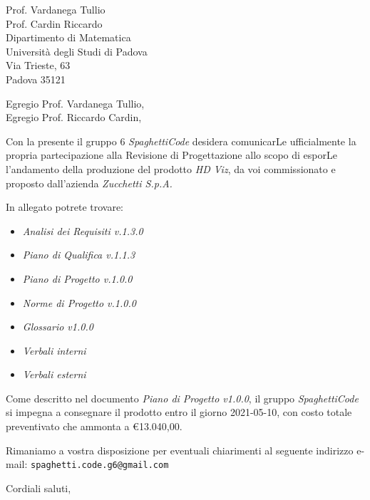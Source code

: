 \documentclass[a4paper,12pt]{letteracdp}
\date{10 marzo 2021}
\begin{document}
\begin{letter}{
		\vspace*{-2\baselineskip}
		Prof. Vardanega Tullio \\
		Prof. Cardin Riccardo \\
		Dipartimento di Matematica \\
		Università degli Studi di Padova \\
		Via Trieste, 63 \\
		Padova 35121}

	\opening{Egregio Prof. Vardanega Tullio, \\
	\noindent Egregio Prof. Riccardo Cardin,}

	\begin{flushleft}
		Con la presente il gruppo 6 \textit{SpaghettiCode} desidera comunicarLe ufficialmente la propria partecipazione alla Revisione di Progettazione allo scopo di esporLe l'andamento della produzione del prodotto 
        \textit{HD Viz}, da voi commissionato e proposto dall'azienda \textit{Zucchetti S.p.A.}
        
		In allegato potrete trovare:
	\end{flushleft}

	\begin{itemize}
		\item \emph{Analisi dei Requisiti v.1.3.0}
		\item \emph{Piano di Qualifica v.1.1.3}
		\item \emph{Piano di Progetto v.1.0.0}
		\item \emph{Norme di Progetto v.1.0.0}
		\item \emph{Glossario v1.0.0}
		\item \emph{Verbali interni}
		\item \emph{Verbali esterni}
	\end{itemize}

	\begin{flushleft}
		Come descritto nel documento \emph{Piano di Progetto v1.0.0}, il gruppo \textit{SpaghettiCode} si impegna a consegnare il prodotto entro il giorno 2021-05-10, con costo totale preventivato che ammonta a \euro{13.040,00}.

		Rimaniamo a vostra disposizione per eventuali chiarimenti al seguente indirizzo e-mail: {\texttt{spaghetti.code.g6@gmail.com}}
	\end{flushleft}

	\closing{Cordiali saluti,}

\end{letter}
\end{document}
